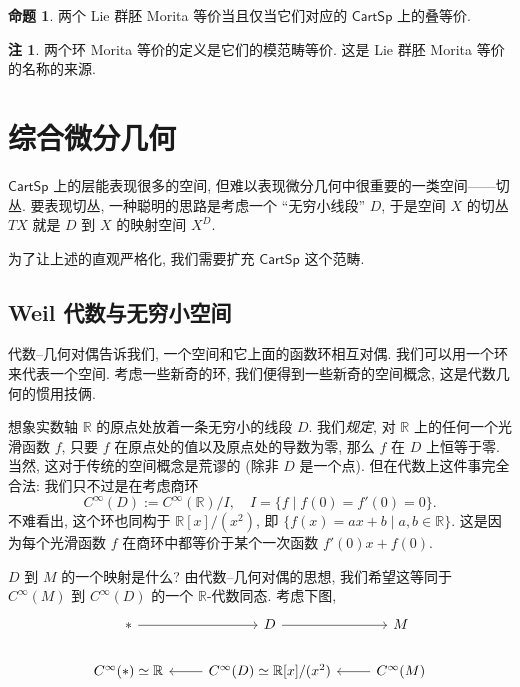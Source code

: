 \documentclass{article}
\theoremstyle{definition}
\newtheorem{prop}[definition]{命题}
\newtheorem{remark}[definition]{注}
\newcommand{\CartSp}{\mathsf{CartSp}}
\begin{document}
	
	
	
	\begin{prop}
		两个 Lie 群胚 Morita 等价当且仅当它们对应的 $\CartSp$ 上的叠等价.
	\end{prop}
	
	\begin{remark}
		两个环 Morita 等价的定义是它们的模范畴等价. 这是 Lie 群胚 Morita 等价的名称的来源.
	\end{remark}
	
	
	\section{综合微分几何}
	
	$\CartSp$ 上的层能表现很多的空间, 但难以表现微分几何中很重要的一类空间------切丛.
	要表现切丛, 一种聪明的思路是考虑一个 ``无穷小线段'' $D$, 于是空间 $X$ 的切丛 $TX$ 就是 $D$ 到 $X$ 的映射空间 $X^D$.
	
	为了让上述的直观严格化, 我们需要扩充 $\CartSp$ 这个范畴.
	
	\subsection{Weil 代数与无穷小空间}
	
	代数--几何对偶告诉我们, 一个空间和它上面的函数环相互对偶. 我们可以用一个环来代表一个空间. 考虑一些新奇的环, 我们便得到一些新奇的空间概念, 这是代数几何的惯用技俩.
	
	想象实数轴 $\mathbb{R}$ 的原点处放着一条无穷小的线段 $D$. 我们\emph{规定}, 对 $\mathbb{R}$ 上的任何一个光滑函数 $f$, 只要 $f$ 在原点处的值以及原点处的导数为零, 那么 $f$ 在 $D$ 上恒等于零. 当然, 这对于传统的空间概念是荒谬的 (除非 $D$ 是一个点). 但在代数上这件事完全合法: 我们只不过是在考虑商环
	$$
	C^\infty (D) := C^\infty (\mathbb{R}) / I,
	\quad
	I = \{f\mid f(0)=f'(0)=0\}.
	$$
	不难看出, 这个环也同构于 $\mathbb{R}[x]/(x^2)$, 即 $\{f(x)=ax+b\mid a,b\in\mathbb{R}\}$. 这是因为每个光滑函数 $f$ 在商环中都等价于某个一次函数 $f'(0)x+f(0)$.
	
	$D$ 到 $M$ 的一个映射是什么? 由代数--几何对偶的思想, 我们希望这等同于 $C^\infty (M)$ 到 $C^\infty (D)$ 的一个 $\mathbb{R}$-代数同态. 考虑下图,
	\[\begin{tikzcd}[ampersand replacement=\&]
		{*} \& D \& M \\
		{C^\infty (*)\simeq \mathbb R} \& {C^\infty (D)\simeq \mathbb{R}[x]/(x^2)} \& {C^\infty (M)}
		\arrow[from=1-1, to=1-2]
		\arrow[from=1-2, to=1-3]
		\arrow[from=2-2, to=2-1]
		\arrow[from=2-3, to=2-2]
	\end{tikzcd}\]
	
\end{document}
